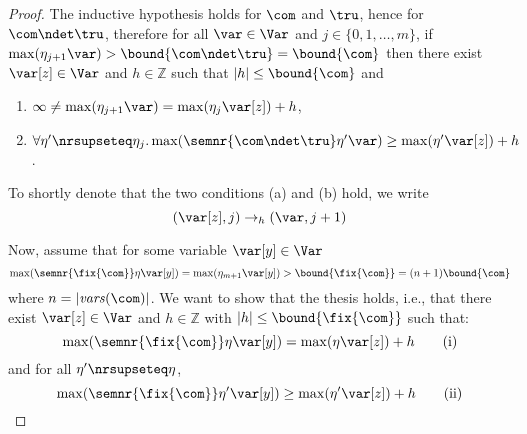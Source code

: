 \begin{proof}
  The inductive hypothesis holds for \(\com\) and \(\tru\), hence for
  \(\com \ndet \tru\), therefore for all \(\var \in \Var\) and
  \(j \in \{0,1, \ldots, m\}\), if \(\max(\eta_{j+1} \var) >\bound{\com\ndet \tru} =\bound{\com}\) then
  there exist \(\var[z] \in \Var\) and \(h \in \mathbb{Z}\) such that \(|h| \leq \bound{\com}\) and 
  \begin{enumerate}[label=(\alph*)]
  \item \(\infty \neq \max(\eta_{j+1} \var) = \max(\eta_j \var[z]) + h\),
  \item \(\forall \eta' \nrsupseteq \eta_j.
    \max(\semnr{\com \ndet \tru}\eta'\var) \geq \max(\eta' \var[z]) + h\).
  \end{enumerate}
  To shortly denote that the two conditions (a) and (b) hold, we write
  \[
  (\var[z],j) \to_{h} (\var, j+1)
  \]
  
  Now, assume that for some variable \(\var[y] \in \Var\)
  \[\max(\semnr{\fix{\com}} \eta \var[y]) = \max(\eta_{m+1} \var[y]) >
  \bound{\fix{\com}} = (n+1) \bound{\com}\]
  where \(n=|\mathit{vars}(\com)|\). 
  We want to show that the thesis holds, i.e., that there exist
  \(\var[z] \in \Var\) and \(h \in \mathbb{Z}\) with
  \(|h| \leq \bound{\fix{\com}}\) such that:
  \begin{equation}\label{eq:maxendmaxstartnr}
    \max(\semnr{\fix{\com}} \eta \var[y]) = \max(\eta \var[z]) + h
    \tag{i}
  \end{equation}
  and for all \(\eta' \nrsupseteq \eta\),
  \begin{equation}\label{eq:maxmiddlemaxendnr}
    \max(\semnr{\fix{\com}} \eta' \var[y]) \geq \max(\eta' \var[z]) + h
    \tag{ii}
  \end{equation}
  

\end{proof}
